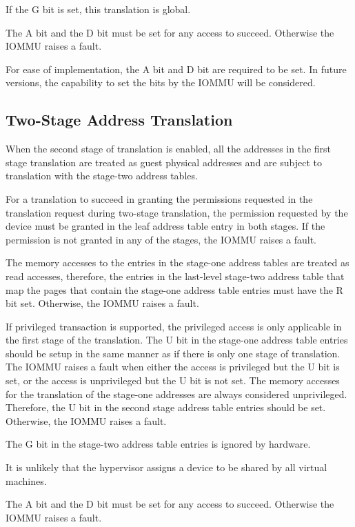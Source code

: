 If the G bit is set, this translation is global.

The A bit and the D bit must be set for any access to succeed. Otherwise the IOMMU raises a fault.

\note For ease of implementation, the A bit and D bit are required to be set. In future
versions, the capability to set the bits by the IOMMU will be considered. \noteend

\subsection{Two-Stage Address Translation}

When the second stage of translation is enabled, all the addresses in the first stage
translation are treated as guest physical addresses and are subject to translation with
the stage-two address tables.

For a translation to succeed in granting the permissions requested in the translation
request during two-stage translation, the permission requested by the device must be
granted in the leaf address table entry in both stages. If the permission is not granted
in any of the stages, the IOMMU raises a fault.

The memory accesses to the entries in the stage-one address tables are treated as read
accesses, therefore, the entries in the last-level stage-two address table that map the
pages that contain the stage-one address table entries must have the R bit set. Otherwise,
the IOMMU raises a fault.

If privileged transaction is supported, the privileged access is only applicable in the
first stage of the translation. The U bit in the stage-one address table entries should be
setup in the same manner as if there is only one stage of translation. The IOMMU raises a
fault when either the access is privileged but the U bit is set, or the access is
unprivileged but the U bit is not set. The memory accesses for the translation of the
stage-one addresses are always considered unprivileged.  Therefore, the U bit in the
second stage address table entries should be set. Otherwise, the IOMMU raises a fault.

The G bit in the stage-two address table entries is ignored by hardware.

\note It is unlikely that the hypervisor assigns a device to be shared by all virtual
machines. \noteend

The A bit and the D bit must be set for any access to succeed. Otherwise the IOMMU raises a fault.


